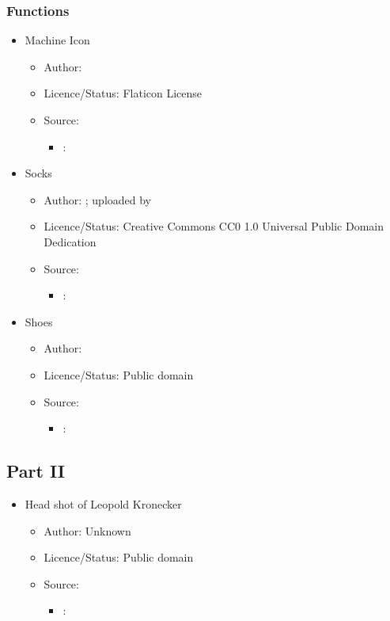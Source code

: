 \subsubsection*{Functions}
\begin{itemize}
    \item Machine Icon
    \begin{itemize}
        \item Author: 
        \item Licence/Status: Flaticon License
        \item Source: 
        \begin{itemize}
            \item {}: 
        \end{itemize}
    \end{itemize}
    \item Socks
    \begin{itemize}
        \item Author: ; uploaded by 
        \item Licence/Status: Creative Commons CC0 1.0 Universal Public Domain Dedication
        \item Source: 
        \begin{itemize}
            \item {}: 
        \end{itemize}
    \end{itemize}
    \item Shoes
    \begin{itemize}
        \item Author: 
        \item Licence/Status: Public domain
        \item Source: 
        \begin{itemize}
            \item {}: 
        \end{itemize}
    \end{itemize}
\end{itemize}

\subsection*{Part II}
\begin{itemize}
    \item Head shot of Leopold Kronecker
    \begin{itemize}
        \item Author: Unknown
        \item Licence/Status: Public domain
        \item Source: 
        \begin{itemize}
            \item {}: 
        \end{itemize}
    \end{itemize}
\end{itemize}

